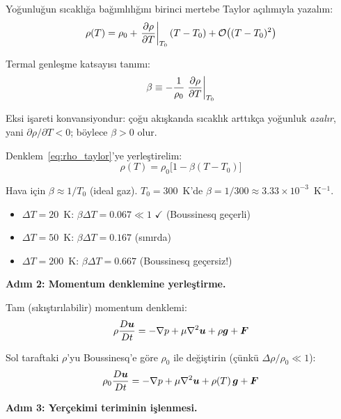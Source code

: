 Yoğunluğun sıcaklığa bağımlılığını birinci mertebe Taylor açılımıyla yazalım:
\begin{equation}
    \rho(T) = \rho_0 + \left.\frac{\partial \rho}{\partial T}\right|_{T_0} (T - T_0) + \mathcal{O}\bigl((T-T_0)^2\bigr)
    \label{eq:rho_taylor}
\end{equation}

Termal genleşme katsayısı tanımı:
\begin{equation}
    \beta \equiv -\frac{1}{\rho_0}\left.\frac{\partial \rho}{\partial T}\right|_{T_0}
    \label{eq:beta_def}
\end{equation}

Eksi işareti konvansiyondur: çoğu akışkanda sıcaklık arttıkça yoğunluk \textit{azalır}, yani $\partial\rho/\partial T < 0$; böylece $\beta > 0$ olur.

Denklem~\eqref{eq:rho_taylor}'ye yerleştirelim:
\begin{equation}
    \rho(T) = \rho_0\bigl[1 - \beta(T - T_0)\bigr]
    \label{eq:boussinesq_eos}
\end{equation}

\begin{example}
Hava için $\beta \approx 1/T_0$ (ideal gaz). $T_0 = 300$~K'de $\beta = 1/300 \approx 3.33 \times 10^{-3}$~K$^{-1}$.
\begin{itemize}
    \item $\Delta T = 20$~K: $\beta\Delta T = 0.067 \ll 1$ $\checkmark$ (Boussinesq geçerli)
    \item $\Delta T = 50$~K: $\beta\Delta T = 0.167$ (sınırda)
    \item $\Delta T = 200$~K: $\beta\Delta T = 0.667$ (Boussinesq geçersiz!)
\end{itemize}
\end{example}

\textbf{Adım 2: Momentum denklemine yerleştirme.}

Tam (sıkıştırılabilir) momentum denklemi:
\begin{equation}
    \rho\frac{D \bm{u}}{Dt} = -\nabla p + \mu\nabla^2\bm{u} + \rho\bm{g} + \bm{F}
\end{equation}

Sol taraftaki $\rho$'yu Boussinesq'e göre $\rho_0$ ile değiştirin (çünkü $\Delta\rho/\rho_0 \ll 1$):
\begin{equation}
    \rho_0\frac{D \bm{u}}{Dt} = -\nabla p + \mu\nabla^2\bm{u} + \rho(T)\,\bm{g} + \bm{F}
\end{equation}

\textbf{Adım 3: Yerçekimi teriminin işlenmesi.}

